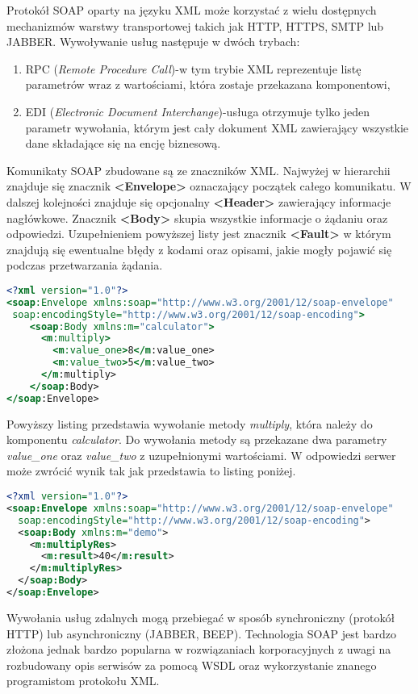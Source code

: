 Protokół SOAP oparty na języku XML może korzystać z wielu dostępnych mechanizmów warstwy transportowej takich jak HTTP, HTTPS, SMTP lub JABBER\@. Wywoływanie usług następuje w dwóch trybach:
\begin{enumerate}
  \item RPC (\textit{Remote Procedure Call})-w tym trybie XML reprezentuje listę parametrów wraz z wartościami, która zostaje przekazana komponentowi,
  \item EDI (\textit{Electronic Document Interchange})-usługa otrzymuje tylko jeden parametr wywołania, którym jest cały dokument XML zawierający wszystkie dane składające się na encję biznesową.
\end{enumerate}
\par Komunikaty SOAP zbudowane są ze znaczników XML\@. Najwyżej w hierarchii znajduje się znacznik \textbf{<Envelope>} oznaczający początek całego komunikatu. W dalszej kolejności znajduje się opcjonalny \textbf{<Header>} zawierający informacje nagłówkowe. Znacznik \textbf{<Body>} skupia wszystkie informacje o żądaniu oraz odpowiedzi. Uzupełnieniem powyższej listy jest znacznik \textbf{<Fault>} w którym znajdują się ewentualne błędy z kodami oraz opisami, jakie mogły pojawić się podczas przetwarzania żądania.
\begin{lstlisting}[language=xslt, caption=Przykład żądania SOAP]
<?xml version="1.0"?>
<soap:Envelope xmlns:soap="http://www.w3.org/2001/12/soap-envelope"
 soap:encodingStyle="http://www.w3.org/2001/12/soap-encoding">
    <soap:Body xmlns:m="calculator">
      <m:multiply>
        <m:value_one>8</m:value_one>
        <m:value_two>5</m:value_two>
      </m:multiply>  
    </soap:Body>
</soap:Envelope> 
\end{lstlisting}
Powyższy listing przedstawia wywołanie metody \textit{multiply}, która należy do komponentu \textit{calculator}. Do wywołania metody są przekazane dwa parametry \textit{value\_one} oraz \textit{value\_two} z uzupełnionymi wartościami. W odpowiedzi serwer może zwrócić wynik tak jak przedstawia to listing poniżej.
\begin{lstlisting}[language=xml, caption=Odpowiedź SOAP serwera na żadanie klienta] 
<?xml version="1.0"?>
<soap:Envelope xmlns:soap="http://www.w3.org/2001/12/soap-envelope"
  soap:encodingStyle="http://www.w3.org/2001/12/soap-encoding">
  <soap:Body xmlns:m="demo">
    <m:multiplyRes>
      <m:result>40</m:result>
    </m:multiplyRes>
  </soap:Body>
</soap:Envelope> 
\end{lstlisting}
Wywołania usług zdalnych mogą przebiegać w sposób synchroniczny (protokół HTTP) lub asynchroniczny (JABBER, BEEP).
Technologia SOAP jest bardzo złożona jednak bardzo popularna w rozwiązaniach korporacyjnych z uwagi na rozbudowany opis serwisów za pomocą WSDL oraz wykorzystanie znanego programistom protokołu XML\@.

